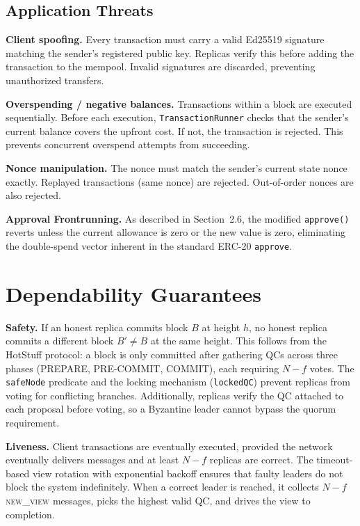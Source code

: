 \documentclass{llncs}
\begin{document}
\subsection{Application Threats}

\textbf{Client spoofing.} Every transaction must carry a valid Ed25519 signature matching the sender's registered public key. Replicas verify this before adding the transaction to the mempool. Invalid signatures are discarded, preventing unauthorized transfers.

\textbf{Overspending / negative balances.} Transactions within a block are executed sequentially. Before each execution, \texttt{TransactionRunner} checks that the sender's current balance covers the upfront cost. If not, the transaction is rejected. This prevents concurrent overspend attempts from succeeding.

\textbf{Nonce manipulation.} The nonce must match the sender's current state nonce exactly. Replayed transactions (same nonce) are rejected. Out-of-order nonces are also rejected.

\textbf{Approval Frontrunning.} As described in Section~2.6, the modified \texttt{approve()} reverts unless the current allowance is zero or the new value is zero, eliminating the double-spend vector inherent in the standard ERC-20 \texttt{approve}.

\section{Dependability Guarantees}

\textbf{Safety.} If an honest replica commits block $B$ at height $h$, no honest replica commits a different block $B' \neq B$ at the same height. This follows from the HotStuff protocol: a block is only committed after gathering QCs across three phases (PREPARE, PRE-COMMIT, COMMIT), each requiring $N{-}f$ votes. The \texttt{safeNode} predicate and the locking mechanism (\texttt{lockedQC}) prevent replicas from voting for conflicting branches. Additionally, replicas verify the QC attached to each proposal before voting, so a Byzantine leader cannot bypass the quorum requirement.

\textbf{Liveness.} Client transactions are eventually executed, provided the network eventually delivers messages and at least $N{-}f$ replicas are correct. The timeout-based view rotation with exponential backoff ensures that faulty leaders do not block the system indefinitely. When a correct leader is reached, it collects $N{-}f$ \textsc{new\_view} messages, picks the highest valid QC, and drives the view to completion.
\end{document}
